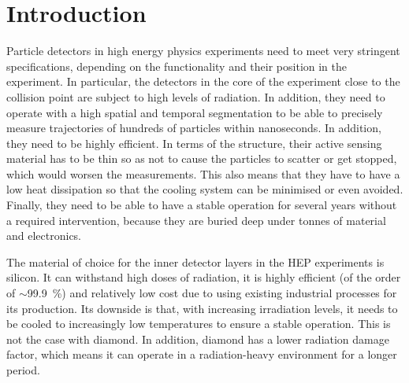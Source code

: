 
\section{Introduction}
Particle detectors in high energy physics experiments need to meet very stringent specifications, depending on the functionality and their position in the experiment. In particular, the detectors in the core of the experiment close to the collision point are subject to high levels of radiation. In addition, they need to operate with a high spatial and temporal segmentation to be able to precisely measure trajectories of hundreds of particles within nanoseconds. In addition, they need to be highly efficient. In terms of the structure, their active sensing material has to be thin so as not to cause the particles to scatter or get stopped, which would worsen the measurements. This also means that they have to have a low heat dissipation so that the cooling system can be minimised or even avoided. Finally, they need to be able to have a stable operation for several years without a required intervention, because they are buried deep under tonnes of material and electronics. 

The material of choice for the inner detector layers in the HEP experiments is silicon. It can withstand high doses of radiation, it is highly efficient (of the order of $\sim$99.9~\%) and relatively low cost due to using existing industrial processes for its production. Its downside is that, with increasing irradiation levels, it needs to be cooled to increasingly low temperatures to ensure a stable operation. This is not the case with diamond. In addition, diamond has a lower radiation damage factor, which means it can operate in a radiation-heavy environment for a longer period.

